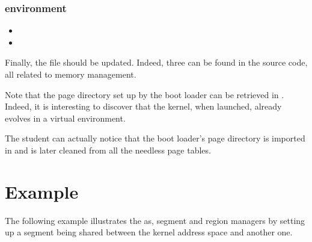 \subsubsection*{environment}

\begin{itemize}
  \item
  \item
\end{itemize}

Finally, the  file should be updated. Indeed,
three  can be found in the source code, all related to memory
management.

Note that the page directory set up by the boot loader can be retrieved
in . Indeed, it is interesting to discover that the
kernel, when launched, already evolves in a virtual environment.

The student can actually notice that the boot loader's page directory is
imported in  and is later
cleaned from all the needless page tables.

%
%

\section{Example}

The following example illustrates the as, segment and region managers by
setting up a segment being shared between the kernel address space and
another one.

